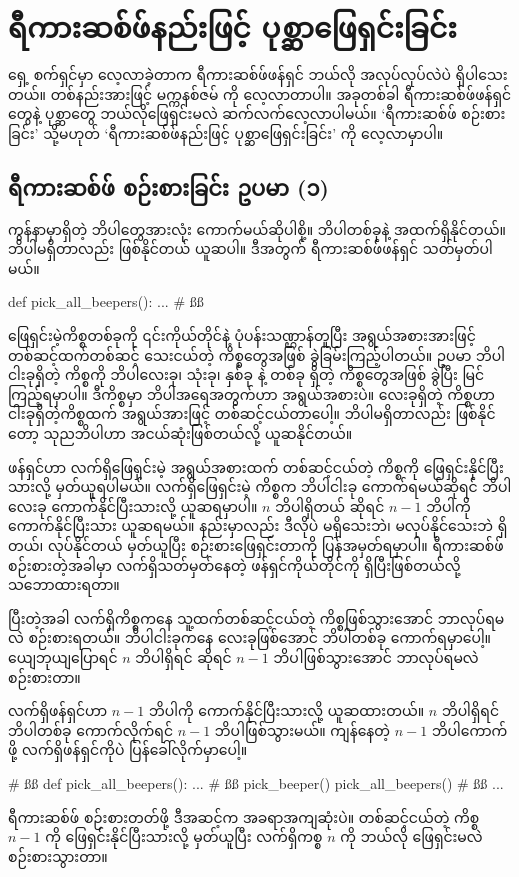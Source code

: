 \section{ရီကားဆစ်ဖ်နည်းဖြင့် ပုစ္ဆာဖြေရှင်းခြင်း}
ရှေ့ စက်ရှင်မှာ လေ့လာခဲ့တာက ရီကားဆစ်ဖ်ဖန်ရှင် ဘယ်လို အလုပ်လုပ်လဲပဲ ရှိပါသေးတယ်။ တစ်နည်း\allowbreak အားဖြင့် မက္ကနစ်ဇမ်  ကို လေ့လာတာပါ။ အခုတစ်ခါ ရီကားဆစ်ဖ်ဖန်ရှင်တွေနဲ့ ပုစ္ဆာတွေ ဘယ်လိုဖြေရှင်းမလဲ ဆက်လက်လေ့လာပါမယ်။  ‘ရီကားဆစ်ဖ် စဉ်းစားခြင်း’ \fEn{)} သို့မဟုတ် ‘ရီကားဆစ်ဖ်နည်းဖြင့် ပုစ္ဆာဖြေရှင်းခြင်း’  ကို လေ့လာမှာပါ။
\subsection*{ရီကားဆစ်ဖ် စဉ်းစားခြင်း ဥပမာ (၁)}
ကွန်နာမှာရှိတဲ့ ဘိပါတွေအားလုံး ကောက်မယ်ဆိုပါစို့။ ဘိပါတစ်ခုနဲ့ အထက်ရှိနိုင်တယ်။ ဘိပါမရှိတာလည်း ဖြစ်နိုင်တယ် ယူဆပါ။ ဒီအတွက် ရီကားဆစ်ဖ်ဖန်ရှင် သတ်မှတ်ပါမယ်။ 
%
\begin{py}
def pick_all_beepers():
    ... # ßß
\end{py}
%

ဖြေရှင်းမဲ့ကိစ္စတစ်ခုကို ၎င်းကိုယ်တိုင်နဲ့ ပုံပန်းသဏ္ဌာန်တူပြီး အရွယ်အစားအားဖြင့် တစ်ဆင့်ထက်တစ်ဆင့် သေးငယ်တဲ့ ကိစ္စတွေအဖြစ် ခွဲခြမ်းကြည့်ပါတယ်။ ဥပမာ ဘိပါငါးခုရှိတဲ့ ကိစ္စကို ဘိပါလေးခု၊ သုံးခု၊ နှစ်ခု နဲ့ တစ်ခု ရှိတဲ့ ကိစ္စတွေအဖြစ် ခွဲပြီး မြင်ကြည့်ရမှာပါ။ ဒီကိစ္စမှာ ဘိပါအရေအတွက်ဟာ အရွယ်အစားပဲ။ လေးခုရှိတဲ့ ကိစ္စဟာ ငါးခုရှိတဲ့ကိစ္စထက် အရွယ်အားဖြင့် တစ်ဆင့်ငယ်တာပေါ့။ ဘိပါမရှိတာလည်း ဖြစ်နိုင်တော့ သုညဘိပါဟာ အငယ်ဆုံးဖြစ်တယ်လို့ ယူဆနိုင်တယ်။

 ဖန်ရှင်ဟာ လက်ရှိဖြေရှင်းမဲ့ အရွယ်အစားထက် တစ်ဆင့်ငယ်တဲ့ ကိစ္စကို ဖြေရှင်းနိုင်ပြီးသားလို့ မှတ်ယူရပါမယ်။ လက်ရှိဖြေရှင်းမဲ့ ကိစ္စက ဘိပါငါးခု ကောက်ရမယ်ဆိုရင် ဘိပါလေးခု ကောက်နိုင်ပြီးသားလို့ ယူဆရမှာပါ။ $n$ ဘိပါရှိတယ် ဆိုရင် $n - 1$ ဘိပါကို ကောက်နိုင်ပြီးသား ယူဆရမယ်။  နည်းမှာလည်း ဒီလိုပဲ မရှိသေးဘဲ၊ မလုပ်နိုင်သေးဘဲ ရှိတယ်၊ လုပ်နိုင်တယ် မှတ်ယူပြီး စဉ်းစားဖြေရှင်းတာကို ပြန်အမှတ်ရမှာပါ။ ရီကားဆစ်ဖ် စဉ်းစားတဲ့အခါမှာ လက်ရှိသတ်မှတ်နေတဲ့ ဖန်ရှင်ကိုယ်တိုင်ကို ရှိပြီးဖြစ်တယ်လို့ သဘောထားရတာ။

ပြီးတဲ့အခါ လက်ရှိကိစ္စကနေ သူ့ထက်တစ်ဆင့်ငယ်တဲ့ ကိစ္စဖြစ်သွားအောင် ဘာလုပ်ရမလဲ စဉ်းစားရတယ်။ ဘိပါငါးခုကနေ လေးခုဖြစ်အောင် ဘိပါတစ်ခု ကောက်ရမှာပေါ့။ ယျေဘုယျပြောရင် $n$ ဘိပါရှိရင် ဆိုရင် $n - 1$ ဘိပါဖြစ်သွားအောင် ဘာလုပ်ရမလဲ စဉ်းစားတာ။

လက်ရှိဖန်ရှင်ဟာ $n - 1$ ဘိပါကို ကောက်နိုင်ပြီးသားလို့ ယူဆထားတယ်။  $n$ ဘိပါရှိရင် ဘိပါတစ်ခု ကောက်လိုက်ရင် $n - 1$ ဘိပါဖြစ်သွားမယ်။  ကျန်နေတဲ့  $n - 1$ ဘိပါကောက်ဖို့ လက်ရှိဖန်ရှင်ကိုပဲ ပြန်ခေါ်လိုက်မှာပေါ့။
%
\begin{py}
# ßß
def pick_all_beepers():
    ...
    # ßß
    pick_beeper()
    pick_all_beepers() # ßß
    ...
\end{py}
%
ရီကားဆစ်ဖ် စဉ်းစားတတ်ဖို့ ဒီအဆင့်က အခရာအကျဆုံးပဲ။ တစ်ဆင့်ငယ်တဲ့ ကိစ္စ $n - 1$ ကို ဖြေရှင်းနိုင်ပြီးသားလို့ မှတ်ယူပြီး လက်ရှိကစ္စ $n$ ကို ဘယ်လို ဖြေရှင်းမလဲ စဉ်းစားသွားတာ။

